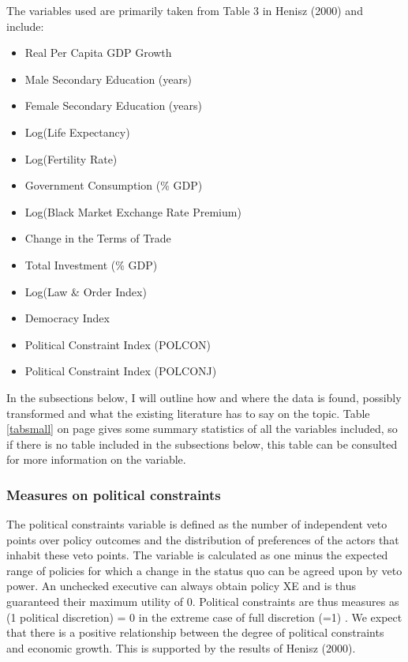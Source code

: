 \documentclass{article}\usepackage{graphicx, color}
\begin{document}
The variables used are primarily taken from Table 3 in Henisz (2000)
and include:
\begin{itemize}
\item Real Per Capita GDP Growth 
\item Male Secondary Education (years) 
\item Female Secondary Education (years) 
\item Log(Life Expectancy) 
\item Log(Fertility Rate) 
\item Government Consumption (\% GDP) 
\item Log(Black Market Exchange Rate Premium)
\item Change in the Terms of Trade
\item Total Investment (\% GDP) 
\item Log(Law \& Order Index)
\item Democracy Index 
\item Political Constraint Index (POLCON) 
\item Political Constraint Index (POLCONJ)
\end{itemize}
In the subsections below, I will outline how and where the data is
found, possibly transformed and what the existing literature has to
say on the topic. Table \ref{tabsmall} on page \pageref{tabsmall}
gives some summary statistics of all the variables included, so if
there is no table included in the subsections below, this table can
be consulted for more information on the variable.


\subsubsection{Measures on political constraints\label{sub:Measures-of-POLCON}}




The political constraints variable is defined as the number of independent
veto points over policy outcomes and the distribution of preferences
of the actors that inhabit these veto points. The variable is calculated
as one minus the expected range of policies for which a change in
the status quo can be agreed upon by veto power. An unchecked executive
can always obtain policy XE and is thus guaranteed their maximum utility
of 0. Political constraints are thus measures as (1 \textendash{}
political discretion) = 0 in the extreme case of full discretion (=1)
\citep{henisz2000theinstitutional}. We expect that there is a positive
relationship between the degree of political constraints and economic
growth. This is supported by the results of Henisz (2000).
\end{document}
